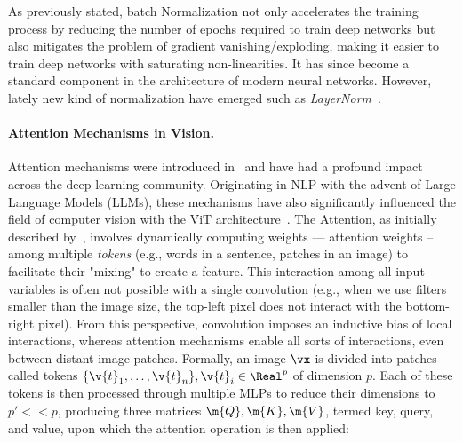 As previously stated, batch Normalization not only accelerates the training process by reducing the number of epochs required to train deep networks but also mitigates the problem of gradient vanishing/exploding, making it easier to train deep networks with saturating non-linearities. It has since become a standard component in the architecture of modern neural networks. However, lately new kind of normalization have emerged such as \textit{LayerNorm}~\cite{ba2016layer}.

\paragraph{Attention Mechanisms in Vision.} Attention mechanisms were introduced in~\cite{vaswani2017attention} and have had a profound impact across the deep learning community. Originating in NLP with the advent of Large Language Models (LLMs), these mechanisms have also significantly influenced the field of computer vision with the ViT architecture~\cite{dosovitskiy2020image,zhai2022scaling,steiner2021train}. The Attention, as initially described by~\cite{vaswani2017attention}, involves dynamically computing weights --- attention weights -- among multiple \textit{tokens} (e.g., words in a sentence, patches in an image) to facilitate their "mixing" to create a feature. This interaction among all input variables is often not possible with a single convolution (e.g., when we use filters smaller than the image size, the top-left pixel does not interact with the bottom-right pixel). From this perspective, convolution imposes an inductive bias of local interactions, whereas attention mechanisms enable all sorts of interactions, even between distant image patches. Formally, an image $\vx$ is divided into patches called tokens $\{\v{t}_1, \ldots, \v{t}_n\}, \v{t}_i \in \Real^{p}$ of dimension $p$. Each of these tokens is then processed through multiple MLPs to reduce their dimensions to $p' << p$, producing three matrices $\m{Q}, \m{K}, \m{V}$, termed key, query, and value, upon which the attention operation is then applied:




